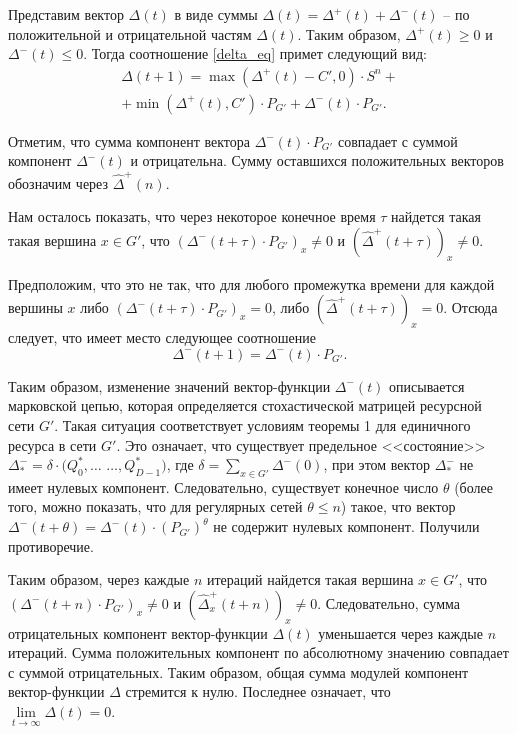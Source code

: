 \documentclass[a4paper,12pt]{article}
\begin{document}
		Представим вектор $\Delta(t)$ в виде суммы $\Delta(t)=\Delta^+(t)+\Delta^-(t)$ -- по положительной и отрицательной частям $\Delta(t)$. Таким образом, $\Delta^+(t)\geq 0$ и $\Delta^-(t)\leq 0$. Тогда соотношение \eqref{delta_eq} примет следующий вид:
		\begin{multline*}
		\Delta(t+1) = \max(\Delta^+(t) - C', 0)\cdot S^n +\\ + \min (\Delta^+(t), C')\cdot P_{G'}  + \Delta^-(t) \cdot P_{G'}.
		\end{multline*} 

		Отметим, что сумма компонент вектора $\Delta^-(t)\cdot P_{G'}$ совпадает с суммой компонент $\Delta^-(t)$ и отрицательна. Сумму оставшихся положительных векторов обозначим через $\hat\Delta^+(n)$.
		
		Нам осталось показать, что через некоторое конечное время $\tau$ найдется такая такая вершина $x\in G'$, что $(\Delta^-(t+\tau)\cdot P_{G'})_x \neq 0$ и $(\hat\Delta^+(t+\tau))_x \neq 0$.		
		
 Предположим, что это не так, что для любого промежутка времени для каждой вершины $x$ либо $(\Delta^-(t+\tau)\cdot P_{G'})_x = 0$, либо $(\hat\Delta^+(t+\tau))_x = 0$. Отсюда следует, что имеет место следующее соотношение 
		\begin{equation}
		\label{delta_neg_eq}
		\Delta^-(t+1) = \Delta^-(t)\cdot P_{G'}.
		\end{equation}
		
		Таким образом, изменение значений вектор-функции $\Delta^-(t)$ описывается марковской цепью, которая определяется стохастической матрицей ресурсной сети $G'$. Такая ситуация соответствует условиям теоремы 1 для единичного ресурса в сети $G'$. Это означает, что существует предельное <<состояние>> $\Delta^-_* = \delta\cdot(Q^*_0,\dots$ $\dots, Q^*_{D-1})$, где $\delta=\sum\limits_{x\in G'}\Delta^-(0)$, при этом вектор $\Delta_*^-$ не имеет нулевых компонент. Следовательно, существует конечное число $\theta$ (более того, можно показать, что для регулярных сетей $\theta\leq n$) такое, что вектор $\Delta^-(t+\theta)=\Delta^-(t)\cdot (P_{G'})^{\theta}$ не содержит нулевых компонент. Получили противоречие.
			
		Таким образом, через каждые $n$ итераций найдется такая вершина $x\in G'$, что $(\Delta^-(t+n)\cdot P_{G'})_x \ne 0$ и $(\hat\Delta^+_x(t+n))_x \ne 0$. Следовательно, сумма отрицательных компонент вектор-функции $\Delta(t)$ уменьшается через каждые $n$ итераций. Сумма положительных компонент по абсолютному значению совпадает с суммой отрицательных. Таким образом, общая сумма модулей компонент век\-тор-функции $\Delta$ стремится к нулю. Последнее означает, что\\ $\lim\limits_{t\to \infty}\Delta(t) = 0$.  
		
\end{document}
